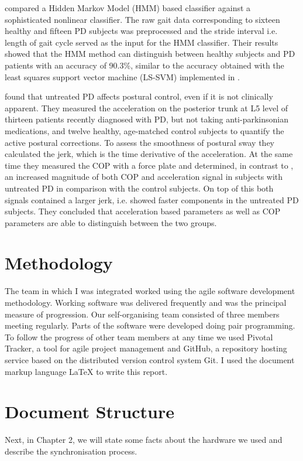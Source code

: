 \citeauthor{khorasani_hmm_2014} \cite{khorasani_hmm_2014} compared a Hidden Markov Model (HMM) based classifier against a sophisticated nonlinear classifier. The raw gait data corresponding to sixteen healthy and fifteen PD subjects was preprocessed and the stride interval i.e. length of gait cycle served as the input for the HMM classifier. Their results showed that the HMM method can distinguish between healthy subjects and PD patients with an accuracy of 90.3\%, similar to the accuracy obtained with the least squares support vector machine (LS-SVM) implemented in \cite{wu_statistical_2010}.

\citeauthor{mancini_isway:_2012} \cite{mancini_isway:_2012} found that untreated PD affects postural control, even if it is not clinically apparent. They measured the acceleration on the posterior trunk at L5 level of thirteen patients recently diagnosed with PD, but not taking anti-parkinsonian medications, and twelve healthy, age-matched control subjects to quantify the active postural corrections. To assess the smoothness of postural sway they calculated the jerk, which is the time derivative of the acceleration. At the same time they measured the COP with a force plate and determined, in contrast to \cite{mancini_anticipatory_2009}, an increased magnitude of both COP and acceleration signal in subjects with untreated PD in comparison with the control subjects. On top of this both signals contained a larger jerk, i.e. showed faster components in the untreated PD subjects. They concluded that acceleration based parameters as well as COP parameters are able to distinguish between the two groups. 

\section{Methodology}

The team in which I was integrated worked using the agile software development methodology. Working software was delivered frequently and was the principal measure of progression. Our self-organising team consisted of three members meeting regularly. Parts of the software were developed doing pair programming. To follow the progress of other team members at any time we used Pivotal Tracker, a tool for agile project management and GitHub, a repository hosting service based on the distributed version control system Git. I used the document markup language \LaTeX{} to write this report.

\section{Document Structure}

Next, in Chapter 2, we will state some facts about the hardware we used and describe the synchronisation process.

